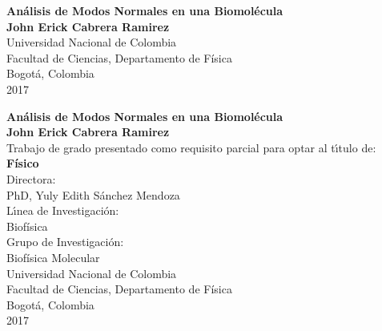 \begin{center}
\begin{figure}
\centering%
%
\end{figure}
\thispagestyle{empty} \vspace*{2.0cm} \textbf{\huge
An\'{a}lisis de Modos Normales \vspace{1cm}
en una Biomol\'{e}cula}\\[5.0cm]
\Large\textbf{John Erick Cabrera Ramirez}\\[6.0cm]
\small Universidad Nacional de Colombia\\
Facultad de Ciencias, Departamento de F\'{i}sica\\
Bogot\'{a}, Colombia\\
2017\\
\end{center}


\newpage
\begin{center}
\thispagestyle{empty} \vspace*{-0.5cm} \textbf{\huge An\'{a}lisis de Modos Normales \vspace{0.2cm} en una Biomol\'{e}cula}\\[3.0cm]
\Large\textbf{John Erick Cabrera Ramirez}\\[3.0cm]
\small Trabajo de grado presentado como requisito parcial para optar al t\'{\i}tulo de:\\
\textbf{F\'{i}sico}\\[2.5cm]
Directora:\\
PhD, Yuly Edith S\'{a}nchez Mendoza \\[2.0cm]
L\'{\i}nea de Investigaci\'{o}n:\\
Biof\'{i}sica\\
Grupo de Investigaci\'{o}n:\\
Biof\'{i}sica Molecular\\[2.5cm]
Universidad Nacional de Colombia\\
Facultad de Ciencias, Departamento de F\'{i}sica\\
Bogot\'{a}, Colombia\\
2017\\
\end{center}

